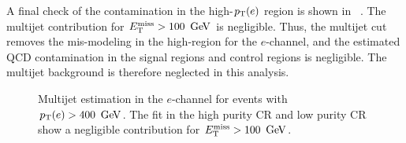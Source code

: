 \clearpage
A final check of the contamination in the high-$p_{\text{T}}(e)$ region is shown in ~\Fig{\ref{fig:qcdfit_highpt}}. The multijet contribution for $\MET>100\,\GeV$ is negligible. Thus, the multijet cut removes the mis-modeling in the high-\pT region for the $e$-channel, and the estimated QCD contamination in the signal regions and control regions is negligible. The multijet background is therefore neglected in this analysis.
\begin{figure}[tb]
\centering
{}
\caption[Multijet estimation for events with high transverse momentum electrons]{Multijet estimation in the $e$-channel for events with $\pT(e)>400\,\GeV$. The fit in the \Wjets \protect{} high purity CR and \protect{} low purity CR show a negligible contribution for $\MET>100\,\GeV$.}
\label{fig:qcdfit_highpt}
\end{figure}



